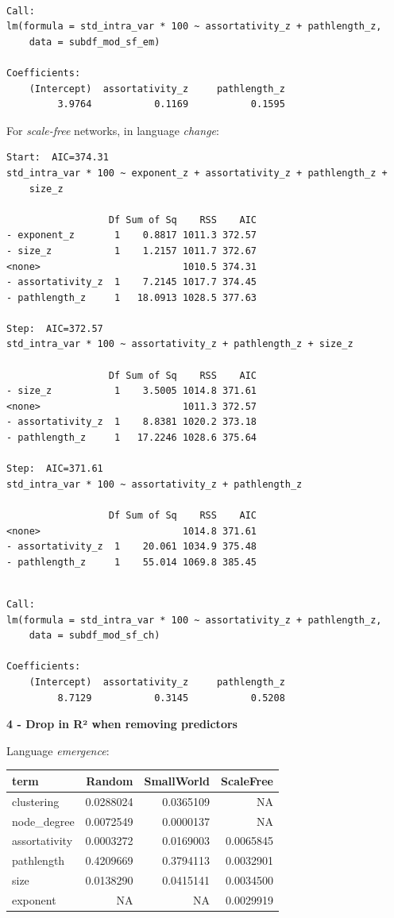 \documentclass[
]{article}
\begin{document}
\begin{verbatim}

Call:
lm(formula = std_intra_var * 100 ~ assortativity_z + pathlength_z, 
    data = subdf_mod_sf_em)

Coefficients:
    (Intercept)  assortativity_z     pathlength_z  
         3.9764           0.1169           0.1595  
\end{verbatim}

For \emph{scale-free} networks, in language \emph{change}:

\begin{verbatim}
Start:  AIC=374.31
std_intra_var * 100 ~ exponent_z + assortativity_z + pathlength_z + 
    size_z

                  Df Sum of Sq    RSS    AIC
- exponent_z       1    0.8817 1011.3 372.57
- size_z           1    1.2157 1011.7 372.67
<none>                         1010.5 374.31
- assortativity_z  1    7.2145 1017.7 374.45
- pathlength_z     1   18.0913 1028.5 377.63

Step:  AIC=372.57
std_intra_var * 100 ~ assortativity_z + pathlength_z + size_z

                  Df Sum of Sq    RSS    AIC
- size_z           1    3.5005 1014.8 371.61
<none>                         1011.3 372.57
- assortativity_z  1    8.8381 1020.2 373.18
- pathlength_z     1   17.2246 1028.6 375.64

Step:  AIC=371.61
std_intra_var * 100 ~ assortativity_z + pathlength_z

                  Df Sum of Sq    RSS    AIC
<none>                         1014.8 371.61
- assortativity_z  1    20.061 1034.9 375.48
- pathlength_z     1    55.014 1069.8 385.45
\end{verbatim}

\begin{verbatim}

Call:
lm(formula = std_intra_var * 100 ~ assortativity_z + pathlength_z, 
    data = subdf_mod_sf_ch)

Coefficients:
    (Intercept)  assortativity_z     pathlength_z  
         8.7129           0.3145           0.5208  
\end{verbatim}

\textbf{4 - Drop in R² when removing predictors}

Language \emph{emergence}:

\begin{longtable}[]{@{}lrrr@{}}
\toprule()
term & Random & SmallWorld & ScaleFree \\
\midrule()
\endhead
clustering & 0.0288024 & 0.0365109 & NA \\
node\_degree & 0.0072549 & 0.0000137 & NA \\
assortativity & 0.0003272 & 0.0169003 & 0.0065845 \\
pathlength & 0.4209669 & 0.3794113 & 0.0032901 \\
size & 0.0138290 & 0.0415141 & 0.0034500 \\
exponent & NA & NA & 0.0029919 \\
\bottomrule()
\end{longtable}
\end{document}

